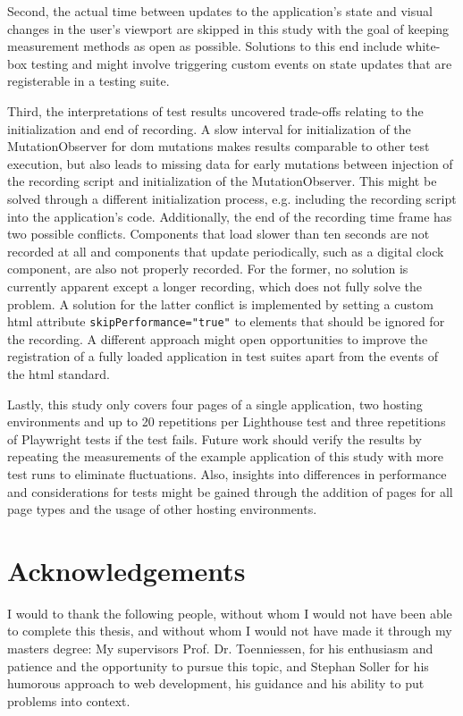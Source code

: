 \documentclass[a4paper, 12pt]{article}
\begin{document}
Second, the actual time between updates to the application's state and visual changes in the user's viewport are skipped in this study with the goal of keeping measurement methods as open as possible.
Solutions to this end include white-box testing and might involve triggering custom events on state updates that are registerable in a testing suite.

Third, the interpretations of test results uncovered trade-offs relating to the initialization and end of recording.
A slow interval for initialization of the MutationObserver for \acrshort{dom} mutations makes results comparable to other test execution, but also leads to missing data for early mutations between injection of the recording script and initialization of the MutationObserver.
This might be solved through a different initialization process, e.g. including the recording script into the application's code.
Additionally, the end of the recording time frame has two possible conflicts.
Components that load slower than ten seconds are not recorded at all and components that update periodically, such as a digital clock component, are also not properly recorded.
For the former, no solution is currently apparent except a longer recording, which does not fully solve the problem.
A solution for the latter conflict is implemented by setting a custom \acrshort{html} attribute \verb|skipPerformance="true"| to elements that should be ignored for the recording.
A different approach might open opportunities to improve the registration of a fully loaded application in test suites apart from the events of the \acrshort{html} standard.

Lastly, this study only covers four pages of a single application, two hosting environments and up to 20 repetitions per Lighthouse test and three repetitions of Playwright tests if the test fails.
Future work should verify the results by repeating the measurements of the example application of this study with more test runs to eliminate fluctuations.
Also, insights into differences in performance and considerations for tests might be gained through the addition of pages for all page types and the usage of other hosting environments. 

\pagebreak

\appendix

\section{Acknowledgements}

I would to thank the following people, without whom I would not have been able to complete this thesis, and without whom I would not have made it through my masters degree:
My supervisors Prof. Dr. Toenniessen, for his enthusiasm and patience and the opportunity to pursue this topic, and Stephan Soller for his humorous approach to web development, his guidance and his ability to put problems into context.
\end{document}
